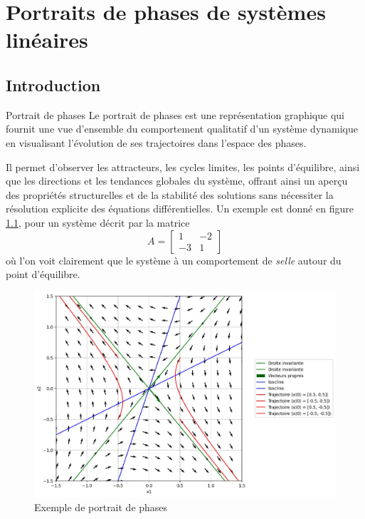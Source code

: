 \chapter{Portraits de phases de systèmes linéaires}\label{chap:portrait_phases}
    \section{Introduction}
        \begin{definition}{Portrait de phases}
            Le portrait de phases est une représentation graphique qui fournit une vue d'ensemble du comportement qualitatif d'un système dynamique en visualisant l'évolution de ses trajectoires dans l'espace des phases.
        \end{definition}
        Il permet d'observer les attracteurs, les cycles limites, les points d'équilibre, ainsi que les directions et les tendances globales du système, offrant ainsi un aperçu des propriétés structurelles et de la stabilité des solutions sans nécessiter la résolution explicite des équations différentielles. Un exemple est donné en figure \ref{fig:exemple_portrait_de_phases}, pour un système décrit par la matrice
        \begin{equation}
            A = \begin{bmatrix}1 & -2\\-3 & 1\end{bmatrix}
        \end{equation}
        où l'on voit clairement que le système à un comportement de \textit{selle} autour du point d'équilibre.

        \begin{figure}[ht!]
            \centering
            \includegraphics[width=\textwidth]{images/exemple_portrait_de_phases.jpg}
            \caption{Exemple de portrait de phases}
            \label{fig:exemple_portrait_de_phases}
        \end{figure}

